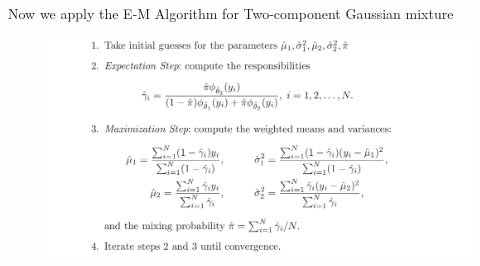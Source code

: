 \documentclass[11pt]{beamer}
\begin{document}
\begin{frame}

\textsf{\linebreak\linebreak
Now we apply the E-M Algorithm for Two-component Gaussian mixture}
\begin{figure}
\includegraphics[scale=.215]{fig10.jpg}
\end{figure}
\end{frame}
\end{document}
